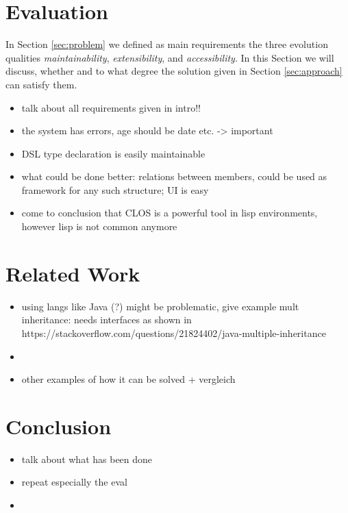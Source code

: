 \documentclass[oribibl]{llncs}
\begin{document}
\section{Evaluation}
\label{sec:evaluation}

In Section \ref{sec:problem} we defined as main requirements the three  evolution qualities \emph{maintainability}, \emph{extensibility}, and \emph{accessibility}. In this Section we will discuss, whether and to what degree the solution given in Section \ref{sec:approach} can satisfy them.


\begin{itemize}
\item talk about all requirements given in intro!!
\item the system has errors, age should be date etc. -> important
\item DSL type declaration is easily maintainable
\item what could be done better: relations between members, could be used as framework for any such structure; UI is easy 
\item come to conclusion that CLOS is a powerful tool in lisp environments, however lisp is not common anymore
\end{itemize}

\section{Related Work}
\label{sec:related}

\begin{itemize}
\item using langs like Java (?) might be problematic, give example mult inheritance: needs interfaces as shown in https://stackoverflow.com/questions/21824402/java-multiple-inheritance
\item 
\item other examples of how it can be solved + vergleich
\end{itemize}


\section{Conclusion}
\label{sec:conclusion}

\begin{itemize}
\item talk about what has been done
\item repeat especially the eval
\item  
\end{itemize} 
\end{document}
